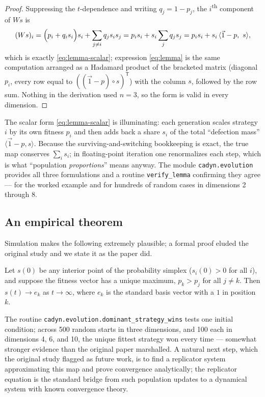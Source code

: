 \begin{proof}
Suppressing the $t$-dependence and writing $q_j = 1-p_j$, the
$i$\textsuperscript{th} component of $W s$ is
\[
  (Ws)_i = \Bigl(p_i + q_i s_i\Bigr)s_i
           + \sum_{j\neq i} q_j s_i s_j
         = p_i s_i + s_i \sum_{j} q_j s_j
         = p_i s_i + s_i\,\langle \vec 1 - p,\ s\rangle,
\]
which is exactly \eqref{eq:lemma-scalar}; expression \eqref{eq:lemma}
is the same computation arranged as a Hadamard product of the bracketed
matrix (diagonal $p_i$, every row equal to $((\vec 1 - p)\circ s)^{\mathsf T}$)
with the column $s$, followed by the row sum.  Nothing in the derivation
used $n=3$, so the form is valid in every dimension.
\end{proof}

The scalar form \eqref{eq:lemma-scalar} is illuminating: each generation
scales strategy~$i$ by its own fitness $p_i$ and then adds back a share
$s_i$ of the total ``defection mass'' $\langle \vec1 - p, s\rangle$.
Because the surviving-and-switching bookkeeping is exact, the true map
conserves $\sum_i s_i$; in floating-point iteration one renormalizes each
step, which is what ``population \emph{proportions}'' means anyway.  The
module \texttt{cadyn.evolution} provides all three formulations and a
routine \texttt{verify\_lemma} confirming they agree --- for the worked
example and for hundreds of random cases in dimensions 2 through 8.

\subsection*{An empirical theorem}

Simulation makes the following extremely plausible; a formal proof
eluded the original study and we state it as the paper did.

\begin{theorem}[empirical]
Let $s(0)$ be any interior point of the probability simplex
($s_i(0) > 0$ for all $i$), and suppose the fitness vector has a unique
maximum, $p_k > p_j$ for all $j \neq k$.  Then $s(t) \to e_k$ as
$t\to\infty$, where $e_k$ is the standard basis vector with a $1$ in
position $k$.
\end{theorem}

The routine \texttt{cadyn.evolution.dominant\_strategy\_wins} tests one
initial condition; across 500 random starts in three dimensions, and 100
each in dimensions 4, 6, and 10, the unique fittest strategy won every
time --- somewhat stronger evidence than the original paper marshalled.
A natural next step, which the original study flagged as future work, is
to find a replicator system approximating this map and prove convergence
analytically; the replicator equation is the standard bridge from such
population updates to a dynamical system with known convergence theory.

